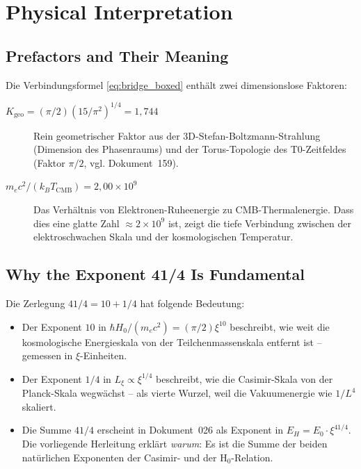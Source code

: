 \section{Physical Interpretation}
\label{sec:interpretation}

\subsection{Prefactors and Their Meaning}

Die Verbindungsformel \eqref{eq:bridge_boxed} enthält zwei dimensionslose Faktoren:

\begin{description}
    \item[$K_\text{geo} = (\pi/2)(15/\pi^2)^{1/4} = 1{,}744$]
        Rein geometrischer Faktor aus der 3D-Stefan-Boltzmann-Strahlung
        (Dimension des Phasenraums) und der Torus-Topologie des T0-Zeitfeldes
        (Faktor $\pi/2$, vgl. Dokument~159).

    \item[$m_e c^2 / (k_B T_\text{CMB}) = 2{,}00 \times 10^9$]
        Das Verhältnis von Elektronen-Ruheenergie zu CMB-Thermalenergie.
        Dass dies eine glatte Zahl $\approx 2 \times 10^9$ ist, zeigt
        die tiefe Verbindung zwischen der elektroschwachen Skala und der
        kosmologischen Temperatur.
\end{description}

\subsection{Why the Exponent 41/4 Is Fundamental}

Die Zerlegung $41/4 = 10 + 1/4$ hat folgende Bedeutung:

\begin{itemize}
    \item Der Exponent $10$ in $\hbar H_0/(m_e c^2) = (\pi/2)\xi^{10}$
    beschreibt, wie weit die kosmologische Energieskala von der
    Teilchenmassenskala entfernt ist -- gemessen in $\xi$-Einheiten.

    \item Der Exponent $1/4$ in $L_\xi \propto \xi^{1/4}$ beschreibt,
    wie die Casimir-Skala von der Planck-Skala wegwächst -- als
    vierte Wurzel, weil die Vakuumenergie wie $1/L^4$ skaliert.

    \item Die Summe $41/4$ erscheint in Dokument~026 als Exponent in
    $E_H = E_0 \cdot \xi^{41/4}$. Die vorliegende Herleitung erklärt
    \emph{warum}: Es ist die Summe der beiden natürlichen Exponenten
    der Casimir- und der H$_0$-Relation.
\end{itemize}

